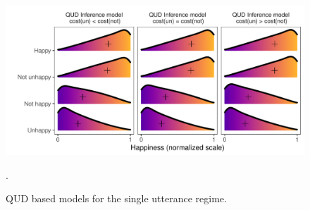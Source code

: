 \documentclass[floatsintext,doc]{apa6}
\let\oldparagraph\paragraph
\renewcommand{\paragraph}[1]{\oldparagraph{#1}\mbox{}}
\begin{document}







\begin{figure}[t]
\centering \includegraphics{figs/qud_SI.pdf} 
\caption{QUD based models for the single utterance regime.}.\label{fig:qud}
\end{figure}
\end{document}
